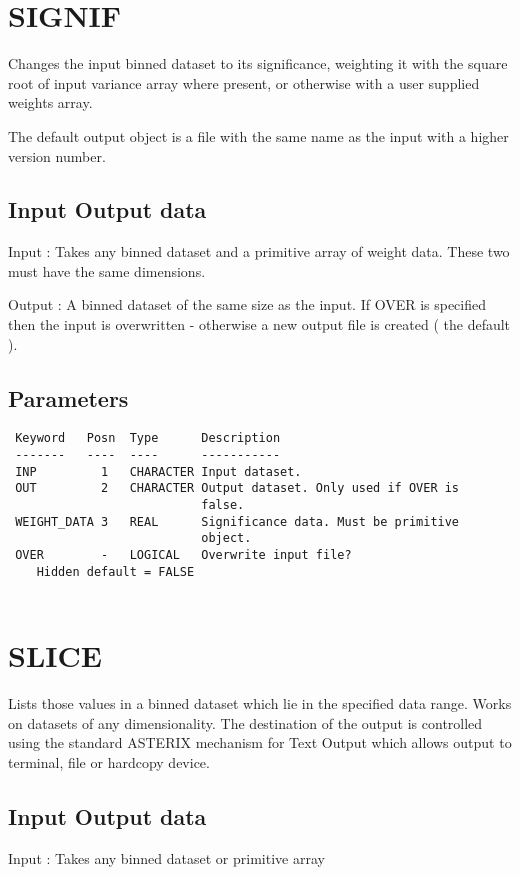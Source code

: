 \documentclass{book}
\renewcommand{\_}{{\tt\char'137}}     %
\begin{document}
\section{SIGNIF}
Changes the input binned dataset to its significance, weighting
it with the square root of input variance array where present,
or otherwise with a user supplied weights array.
 
The default output object is a file with the same name as the
input with a higher version number.
 
\subsection{Input Output data}
Input : Takes any binned dataset and a
primitive array of weight data. These
two must have the same dimensions.
 
Output : A binned dataset of the same size as
the input. If OVER is specified then
the input is overwritten - otherwise
a new output file is created ( the
default ).
 
\subsection{Parameters}
\begin{verbatim}
 Keyword   Posn  Type      Description
 -------   ----  ----      -----------
 INP         1   CHARACTER Input dataset.
 OUT         2   CHARACTER Output dataset. Only used if OVER is
                           false.
 WEIGHT_DATA 3   REAL      Significance data. Must be primitive
                           object.
 OVER        -   LOGICAL   Overwrite input file?
    Hidden default = FALSE
 
\end{verbatim}\section{SLICE}
Lists those values in a binned dataset which lie in the specified
data range. Works on datasets of any dimensionality. The destination
of the output is controlled using the standard ASTERIX mechanism
for Text Output which allows output to terminal, file or
hardcopy device.
 
\subsection{Input Output data}
Input : Takes any binned dataset or primitive array
\end{document}
